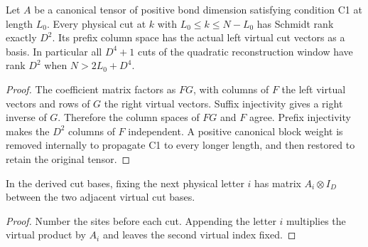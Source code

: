 \begin{lemma}
    \label{lem:quadratic_injective_physical_cut}
    \leanok
    Let $A$ be a canonical tensor of positive bond dimension satisfying
    condition C1 at length $L_0$. Every physical cut at $k$ with
    $L_0\leq k\leq N-L_0$ has Schmidt rank exactly $D^2$.
    Its prefix column space has the actual left virtual cut vectors
    as a basis. In particular all $D^4+1$ cuts of the quadratic
    reconstruction window have rank $D^2$ when $N>2L_0+D^4$.
\end{lemma}
\begin{proof}
    \leanok
    The coefficient matrix factors as $FG$, with columns of $F$ the
    left virtual vectors and rows of $G$ the right virtual vectors.
    Suffix injectivity gives a right inverse of $G$. Therefore the
    column spaces of $FG$ and $F$ agree. Prefix injectivity makes the
    $D^2$ columns of $F$ independent. A positive canonical block weight
    is removed internally to propagate C1 to every longer length, and
    then restored to retain the original tensor.
\end{proof}

\begin{lemma}
    \label{lem:quadratic_virtual_cut_slicing}
    \leanok
    In the derived cut bases, fixing the next physical letter $i$ has
    matrix $A_i\otimes I_D$ between the two adjacent virtual cut bases.
\end{lemma}
\begin{proof}
    \leanok
    Number the sites before each cut. Appending the letter $i$ multiplies
    the virtual product by $A_i$ and leaves the second virtual index fixed.
\end{proof}

